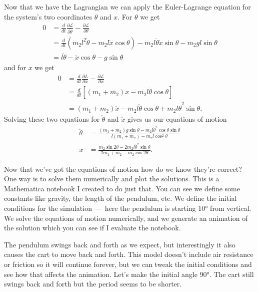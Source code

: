 \documentclass{article}
\begin{document}
Now that we have the Lagrangian we can apply the Euler-Lagrange equation for the system's two coordinates $\theta$ and $x$. For $\theta$ we get \begin{align*}
  0 & = \frac{d}{d t} \frac{\partial \mathcal{L}}{\partial \dot{\theta}} - \frac{\partial \mathcal{L}}{\partial \theta}                 \\
    & = \frac{d}{d t} (m_2 l^2 \dot{\theta} - m_2 l \dot{x} \cos \theta) - m_2 l \dot{\theta} \dot{x} \sin \theta - m_2 g l \sin \theta \\
    & = l \ddot{\theta} - \ddot{x} \cos \theta - g \sin \theta
\end{align*} and for $x$ we get \begin{align*}
  0 & = \frac{d}{d t} \frac{\partial L}{\partial \dot{x}} - \frac{\partial \mathcal{L}}{\partial x} \\
    & = \frac{d}{d t} [(m_1 + m_2) \dot{x} - m_2 l \dot{\theta} \cos \theta]                        \\
    & = (m_1 + m_2) \ddot{x} - m_2 l \ddot{\theta} \cos \theta + m_2 l \dot{\theta}^2 \sin \theta.
\end{align*} Solving these two equations for $\ddot{\theta}$ and $\ddot{x}$ gives us our equations of motion \begin{align*}
  \ddot{\theta} & = \frac{(m_1 + m_2) g \sin \theta - m_2 l \dot{\theta}^2 \cos \theta \sin \theta}{l (m_1 + m_2) - m_2 l \cos^2 \theta} \\
  \ddot{x}      & = \frac{m_2 \sin 2 \theta - 2 m_2 l \dot{\theta}^2 \sin \theta}{2 m_1 + m_2 - m_2 \cos 2 \theta}.
\end{align*}

Now that we've got the equations of motion how do we know they're correct? One way is to solve them numerically and plot the solutions. This is a Mathematica notebook I created to do just that. You can see we define some constants like gravity, the length of the pendulum, etc. We define the initial conditions for the simulation — here the pendulum is starting $\ang{10}$ from vertical. We solve the equations of motion numerically, and we generate an animation of the solution which you can see if I evaluate the notebook.

The pendulum swings back and forth as we expect, but interestingly it also causes the cart to move back and forth. This model doesn't include air resistance or friction so it will continue forever, but we can tweak the initial conditions and see how that affects the animation. Let's make the initial angle $\ang{90}$. The cart still swings back and forth but the period seems to be shorter.
\end{document}
